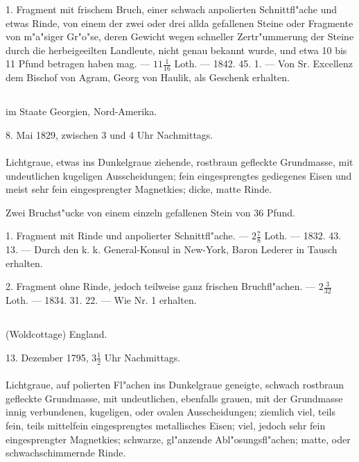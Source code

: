 \documentclass[a4paper, 11pt, oneside, polutonikogreek, german]{article}
\begin{document}
1. Fragment mit frischem Bruch, einer schwach anpolierten Schnittfl"ache und etwas Rinde, von einem der zwei oder drei allda gefallenen Steine oder Fragmente von m"a"siger Gr"o"se, deren Gewicht wegen schneller Zertr"ummerung der Steine durch die herbeigeeilten Landleute, nicht genau bekannt wurde, und etwa 10 bis 11 Pfund betragen haben mag. --- $\mathfrak{11\frac{1}{16}}$ Loth. --- 1842. 45. 1. --- Von Sr. Excellenz dem Bischof von Agram, Georg von Haulik, als Geschenk erhalten.
\subsection[\swabfamily {Forsyth.}]{}
\begin{center}

im Staate Georgien, Nord-Amerika.

8. Mai 1829, zwischen 3 und 4 Uhr Nachmittags.
\end{center}
\paragraph{}
Lichtgraue, etwas ins Dunkelgraue ziehende, rostbraun gefleckte Grundmasse, mit undeutlichen kugeligen Ausscheidungen; fein eingesprengtes gediegenes Eisen und meist sehr fein eingesprengter Magnetkies; dicke, matte Rinde.

Zwei Bruchst"ucke von einem einzeln gefallenen Stein von 36 Pfund.

1. Fragment mit Rinde und anpolierter Schnittfl"ache. --- $\mathfrak{2\frac{7}{8}}$ Loth. --- 1832. 43. 13. --- Durch den k. k. General-Konsul in New-York, Baron Lederer in Tausch erhalten.

2. Fragment ohne Rinde, jedoch teilweise ganz frischen Bruchfl"achen. --- $\mathfrak{2\frac{3}{32}}$ Loth. --- 1834. 31. 22. --- Wie Nr. 1 erhalten.
\subsection{}
\begin{center}

(Woldcottage) England.

13. Dezember 1795, $\mathfrak{3\frac{1}{2}}$ Uhr Nachmittags.
\end{center}
\paragraph{}
Lichtgraue, auf polierten Fl"achen ins Dunkelgraue geneigte, schwach rostbraun gefleckte Grundmasse, mit undeutlichen, ebenfalls grauen, mit der Grundmasse innig verbundenen, kugeligen, oder ovalen Ausscheidungen; ziemlich viel, teils fein, teils mittelfein eingesprengtes metallisches Eisen; viel, jedoch sehr fein eingesprengter Magnetkies; schwarze, gl"anzende Abl"osungsfl"achen; matte, oder schwachschimmernde Rinde.
\end{document}
